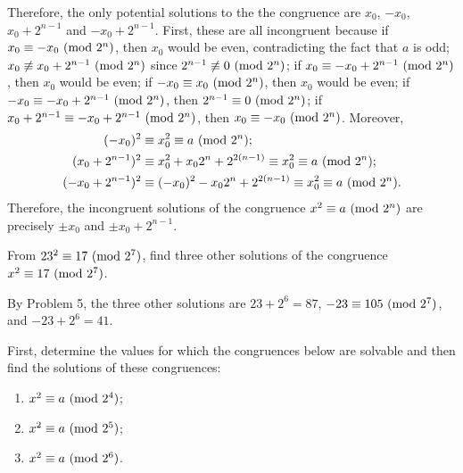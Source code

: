 \begin{solution}
    Therefore, the only potential solutions to the the congruence are $x_0$, $-x_0$, $x_0 + 2^{n-1}$ and $-x_0 + 2^{n-1}$. First, these are all incongruent because if $x_0 \equiv -x_0 \ (\mathrm{mod}\ 2^n)$, then $x_0$ would be even, contradicting the fact that $a$ is odd; $x_0 \not\equiv x_0 + 2^{n-1} \ (\mathrm{mod}\ 2^n)$ since $2^{n-1} \not\equiv 0 \ (\mathrm{mod}\ 2^n)$; if $x_0 \equiv -x_0 + 2^{n-1}\ (\mathrm{mod}\ 2^n)$, then $x_0$ would be even; if $-x_0 \equiv x_0 \ (\mathrm{mod}\ 2^n)$, then $x_0$ would be even; if $-x_0 \equiv -x_0 + 2^{n-1} \ (\mathrm{mod}\ 2^n)$, then $2^{n-1} \equiv 0 \ (\mathrm{mod}\ 2^n)$; if $x_0 + 2^{n-1} \equiv -x_0 + 2^{n-1} \ (\mathrm{mod}\ 2^n)$, then $x_0 \equiv -x_0 \ (\mathrm{mod}\ 2^n)$. Moreover,
    \begin{align*}
        (-x_0)^2 &\equiv x_0^2 \equiv a \ (\mathrm{mod}\ 2^n); \\
        (x_0 + 2^{n-1})^2 &\equiv x_0^2 + x_02^n + 2^{2(n-1)} \equiv x_0^2 \equiv a \ (\mathrm{mod}\ 2^n); \\
        (-x_0 + 2^{n-1})^2 &\equiv (-x_0)^2 - x_02^n + 2^{2(n-1)} \equiv x_0^2 \equiv a \ (\mathrm{mod}\ 2^n).
    \end{align*}
    Therefore, the incongruent solutions of the congruence $x^2 \equiv a \ (\mathrm{mod}\ 2^n)$ are precisely $\pm x_0$ and $\pm x_0 + 2^{n-1}$. \\
\end{solution}

\begin{exercise}
    From $23^2 \equiv 17 \ (\mathrm{mod}\ 2^7)$, find three other solutions of the congruence $x^2 \equiv 17 \ (\mathrm{mod}\ 2^7)$. \\
\end{exercise}

\begin{solution}
    By Problem 5, the three other solutions are $23 + 2^6 = 87$, $-23 \equiv 105 \ (\mathrm{mod}\ 2^7)$, and $-23 + 2^6 = 41$. \\
\end{solution}

\begin{exercise}
    First, determine the values for which the congruences below are solvable and then find the solutions of these congruences:
    \begin{enumerate}
        \item $x^2 \equiv a \ (\mathrm{mod}\ 2^4)$;
        \item $x^2 \equiv a \ (\mathrm{mod}\ 2^5)$;
        \item $x^2 \equiv a \ (\mathrm{mod}\ 2^6)$.\\
    \end{enumerate}
\end{exercise}

